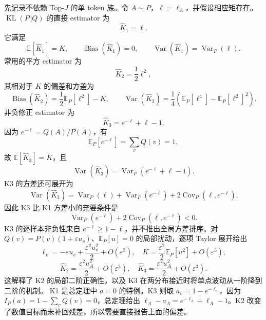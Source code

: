 \documentclass[lang=cn,scheme=chinese,openany]{../book/elegantbook}
\newcommand{\E}{\mathbb E}
\newcommand{\KL}{\operatorname{KL}}
\newcommand{\Var}{\operatorname{Var}}
\begin{document}
先记录不依赖 Top-$J$ 的单 token 族。令 $A\sim P$，$\ell=\ell_A$，并假设相应矩存在。$\KL(P\Vert Q)$ 的直接 estimator 为
\begin{equation*}
 \widehat K_1=\ell.
\end{equation*}
它满足
\begin{equation*}
 \E[\widehat K_1]=K,\qquad
 \operatorname{Bias}(\widehat K_1)=0,\qquad
 \Var(\widehat K_1)=\Var_P(\ell).
\end{equation*}
常用的平方 estimator 为
\begin{equation*}
 \widehat K_2=\frac12\ell^2,
\end{equation*}
其相对于 $K$ 的偏差和方差为
\begin{equation}
 \operatorname{Bias}(\widehat K_2)=\frac12\E_P[\ell^2]-K,
 \qquad
 \Var(\widehat K_2)=\frac14\left(\E_P[\ell^4]-\E_P[\ell^2]^2\right).
 \label{est:eq:chapter3-k2-bias-var}
\end{equation}
非负修正 estimator 为
\begin{equation*}
 \widehat K_3=e^{-\ell}+\ell-1.
\end{equation*}
因为 $e^{-\ell}=Q(A)/P(A)$，有
\begin{equation*}
 \E_P[e^{-\ell}]=\sum_vQ(v)=1,
\end{equation*}
故 $\E[\widehat K_3]=K$，且
\begin{equation}
 \Var(\widehat K_3)=\Var_P(e^{-\ell}+\ell-1).
 \label{est:eq:chapter3-k3-var}
\end{equation}
K3 的方差还可展开为
\begin{equation*}
 \Var(\widehat K_3)
 =\Var_P(\ell)+\Var_P(e^{-\ell})+2\operatorname{Cov}_P(\ell,e^{-\ell}).
\end{equation*}
因此 K3 比 K1 方差小的充要条件是
\begin{equation*}
 \Var_P(e^{-\ell})+2\operatorname{Cov}_P(\ell,e^{-\ell})<0.
\end{equation*}
K3 的逐样本非负性来自 $e^{-\ell}\geq1-\ell$，并不推出全局方差排序。对 $Q(v)=P(v)(1+\varepsilon u_v)$、$\E_P[u]=0$ 的局部扰动，逐项 Taylor 展开给出
\begin{equation*}
 \ell_v=-\varepsilon u_v+\frac{\varepsilon^2u_v^2}{2}+O(\varepsilon^3),
 \quad K=\frac{\varepsilon^2}{2}\E_P[u^2]+O(\varepsilon^3),
\end{equation*}
\begin{equation*}
 \widehat K_2=\frac{\varepsilon^2u_A^2}{2}+O(\varepsilon^3),
 \quad \widehat K_3=\frac{\varepsilon^2u_A^2}{2}+O(\varepsilon^3).
\end{equation*}
这解释了 K2 的局部二阶正确性，以及 K3 在两分布接近时将单点波动从一阶降到二阶的机制。
K1 是总定理中 $a=0$ 的特例。K3 则取 $a_v=1-e^{-\ell_v}$，因为 $I_P(a)=1-\sum_vQ(v)=0$，总定理给出 $\ell_A-a_A=e^{-\ell_A}+\ell_A-1$。K2 改变了数值目标而未补回残差，所以需要直接报告上面的偏差。
\end{document}
